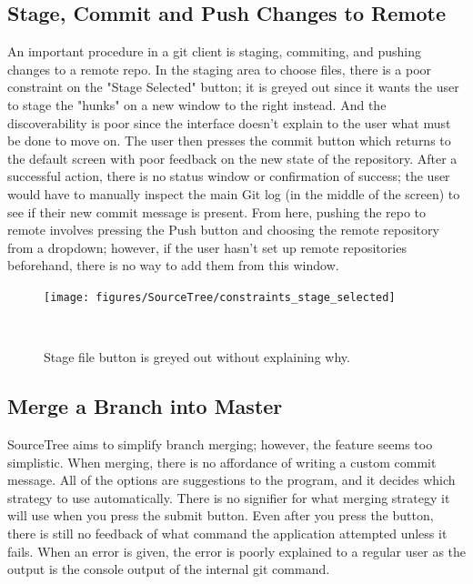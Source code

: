 \documentclass{sigchi}
\begin{document}
\subsection{Stage, Commit and Push Changes to Remote}
An important procedure in a git client is staging, commiting, and pushing 
changes to a remote repo. 
In the staging area to choose files, there is a poor constraint on the 
"Stage Selected" button; it is greyed out since it wants the user to stage 
the "hunks" on a new window to the right instead. And the discoverability is poor 
since the interface doesn't explain to the user what must be done to move on.
The user then presses the commit button which returns to the default screen 
with poor feedback on the new state of the repository. After a successful action,
there is no status window or confirmation of success; the user would have to manually
inspect the main Git log (in the middle of the screen) to see if their new commit message 
is present. From here, pushing the repo to remote involves pressing the Push button and choosing
the remote repository from a dropdown; however, if the user hasn't set up remote repositories beforehand,
there is no way to add them from this window.

\begin{figure}
  \centering
  \texttt{[image: figures/SourceTree/constraints\_stage\_selected]}
  \caption{Stage file button is greyed out without explaining why.}~\label{fig:SourceTreeConstraint}
\end{figure}


\subsection{Merge a Branch into Master}
SourceTree aims to simplify branch merging; however, the feature seems too 
simplistic. When merging, there is no affordance of writing a custom commit 
message. All of the options are suggestions to the program, and it decides 
which strategy to use automatically. There is no signifier for what merging 
strategy it will use when you press the submit button. Even after you press 
the button, there is still no feedback of what command the application 
attempted unless it fails. When an error is given, the error is poorly 
explained to a regular user as the output is the console output of the 
internal git command.
\end{document}
